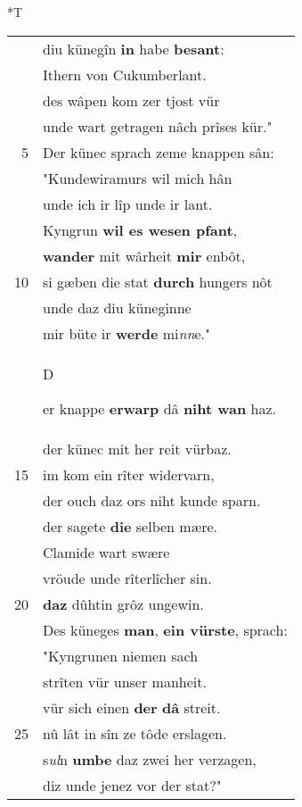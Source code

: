 \documentclass[8pt,a4paper,notitlepage]{article}
\begin{document}
\begin{table}[ht]
\begin{minipage}[t]{0.5\linewidth}
\end{minipage}
\hspace{0.5cm}
\begin{minipage}[t]{0.5\linewidth}
\small
\begin{center}*T
\end{center}
\begin{tabular}{rl}
 & diu künegîn \textbf{in} habe \textbf{besant}:\\ 
 & Ithern von Cukumberlant.\\ 
 & des wâpen kom zer tjost vür\\ 
 & unde wart getragen nâch prîses kür."\\ 
5 & Der künec sprach zeme knappen sân:\\ 
 & "Kundewiramurs wil mich hân\\ 
 & unde ich ir lîp unde ir lant.\\ 
 & Kyngrun \textbf{wil es wesen pfant},\\ 
 & \textbf{wander} mit wârheit \textbf{mir} enbôt,\\ 
10 & si gæben die stat \textbf{durch} hungers nôt\\ 
 & unde daz diu küneginne\\ 
 & mir büte ir \textbf{werde} mi\textit{nn}e."\\ 
 & \begin{large}D\end{large}er knappe \textbf{erwarp} dâ \textbf{niht wan} haz.\\ 
 & der künec mit her reit vürbaz.\\ 
15 & im kom ein rîter widervarn,\\ 
 & der ouch daz ors niht kunde sparn.\\ 
 & der sagete \textbf{die} selben mære.\\ 
 & Clamide wart swære\\ 
 & vröude unde rîterlîcher sin.\\ 
20 & \textbf{daz} dûhtin grôz ungewin.\\ 
 & Des küneges \textbf{man}, \textbf{ein vürste}, sprach:\\ 
 & "Kyngrunen niemen sach\\ 
 & strîten vür unser manheit.\\ 
 & vür sich einen \textbf{der} \textbf{dâ} streit.\\ 
25 & nû lât in sîn ze tôde erslagen.\\ 
 & s\textit{ul}n \textbf{umbe} daz zwei her verzagen,\\ 
 & diz unde jenez vor der stat?"\\ 

\end{tabular}
\end{minipage}
\end{table}
\end{document}
